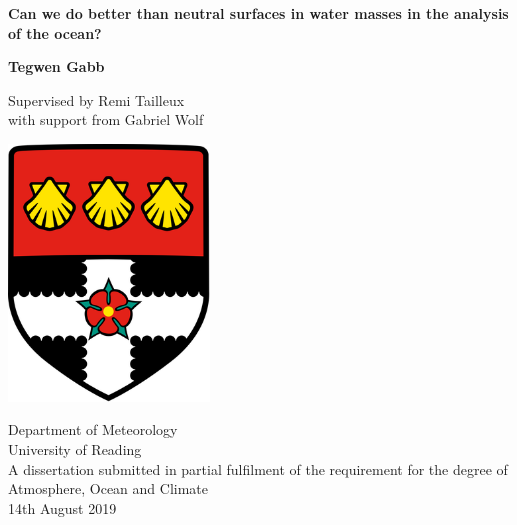 \begin{titlepage}
    \begin{center}
        \vspace*{1cm}
 
        \huge
        \textbf{Can we do better than neutral surfaces in water masses in the analysis of the ocean?}
        
        \LARGE
        \vspace*{1.0cm}
        \textbf{Tegwen Gabb}
        
        \vspace*{0.5cm}
        \Large
        Supervised by Remi Tailleux \\
        with support from Gabriel Wolf
 
        \vfill
        
        \includegraphics[width=0.4\textwidth]{university}
 
        \Large
        Department of Meteorology\\
        University of Reading\\
        \normalsize
        A dissertation submitted in partial fulfilment of the requirement for the degree of Atmosphere, Ocean and Climate \\
        14th August 2019
        
 
    \end{center}
\end{titlepage}

\begin{abstract}
    
\end{abstract}
\setcounter{page}{1}
\tableofcontents
\listoffigures

\newpage